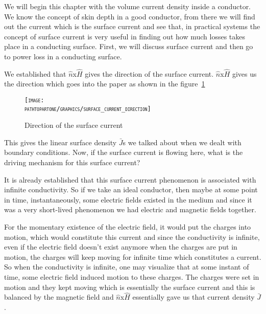 We will begin this chapter with the volume current density inside a conductor. We know the concept of skin depth in a good conductor, from there we will find out the current which is the surface current and see that, in practical systems the concept of surface current is very useful in finding out how much losses takes place in a conducting surface. First, we will discuss surface current and then go to power loss in a conducting surface.

We established that $\hat{n}$x$\hat{H}$ gives the direction of the surface current. $\hat{n}$x$\hat{H}$ gives us the direction which goes into the paper as shown in the figure~\ref{fig:direction_of_surface_current}
\begin{figure}[h]
\centering
\textsc{\texttt{[image: \\pathtopartone/graphics/surface\_current\_direction]}}
\caption{Direction of the surface current}
\label{fig:direction_of_surface_current}
\end{figure}

This gives the linear surface density $\bar{J}$s we talked about when we dealt with boundary conditions. Now, if the surface current is flowing here, what is the driving mechanism for this surface current?

It is already established that this surface current phenomenon is associated with infinite conductivity. So if we take an ideal conductor, then maybe at some point in time, instantaneously, some electric fields existed in the medium and since it was a very short-lived phenomenon we had electric and magnetic fields together.

For the momentary existence of the electric field, it would put the charges into motion, which would constitute this current and since the conductivity is infinite, even if the electric field doesn't exist anymore when the charges are put in motion, the charges will keep moving for infinite time which constitutes a current. So when the conductivity is infinite, one may visualize that at some instant of time, some electric field induced motion to these charges. The charges were set in motion and they kept moving which is essentially the surface current and this is balanced by the magnetic field and $\hat{n}$x$\hat{H}$ essentially gave us that current density $\bar{J}$.

